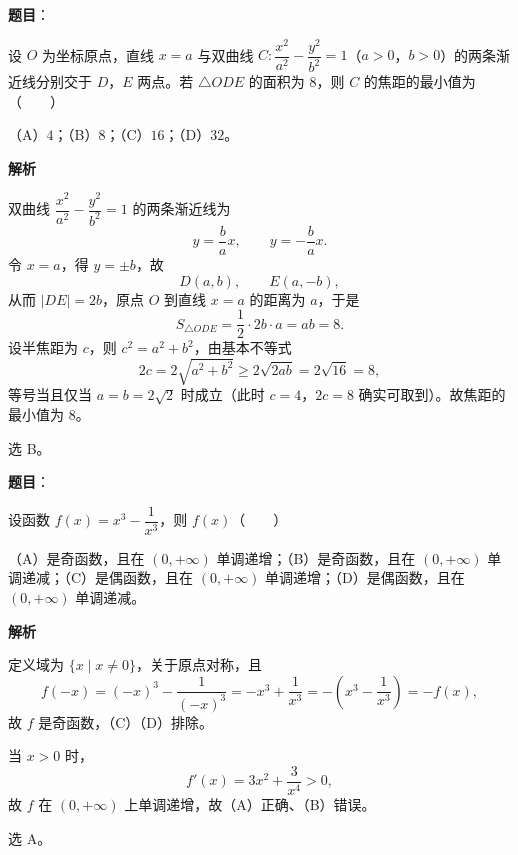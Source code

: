 \begin{answer}

\textbf{题目}：

设 $O$ 为坐标原点，直线 $x=a$ 与双曲线 $C:\dfrac{x^2}{a^2}-\dfrac{y^2}{b^2}=1$（$a>0$，$b>0$）的两条渐近线分别交于 $D$，$E$ 两点。若 $\triangle ODE$ 的面积为 $8$，则 $C$ 的焦距的最小值为\mbox{（　　）}

（A）$4$；（B）$8$；（C）$16$；（D）$32$。

\textbf{解析}

双曲线 $\dfrac{x^2}{a^2}-\dfrac{y^2}{b^2}=1$ 的两条渐近线为
\nopagebreak[4]
\[y=\frac ba x,\qquad y=-\frac ba x .\]
令 $x=a$，得 $y=\pm b$，故
\nopagebreak[4]
\[D(a,b),\qquad E(a,-b),\]
从而 $|DE|=2b$，原点 $O$ 到直线 $x=a$ 的距离为 $a$，于是
\nopagebreak[4]
\[S_{\triangle ODE}=\frac12\cdot 2b\cdot a=ab=8 .\]
设半焦距为 $c$，则 $c^2=a^2+b^2$，由基本不等式
\nopagebreak[4]
\[2c=2\sqrt{a^2+b^2}\geqslant2\sqrt{2ab}=2\sqrt{16}=8,\]
等号当且仅当 $a=b=2\sqrt2$ 时成立（此时 $c=4$，$2c=8$ 确实可取到）。故焦距的最小值为 $8$。

选 B。


\end{answer}
\begin{answer}

\textbf{题目}：

设函数 $f(x)=x^3-\dfrac1{x^3}$，则 $f(x)$\mbox{（　　）}

（A）是奇函数，且在 $(0,+\infty)$ 单调递增；（B）是奇函数，且在 $(0,+\infty)$ 单调递减；（C）是偶函数，且在 $(0,+\infty)$ 单调递增；（D）是偶函数，且在 $(0,+\infty)$ 单调递减。

\textbf{解析}

定义域为 $\{x\mid x\neq0\}$，关于原点对称，且
\nopagebreak[4]
\[f(-x)=(-x)^3-\frac1{(-x)^3}=-x^3+\frac1{x^3}=-\left(x^3-\frac1{x^3}\right)=-f(x),\]
故 $f$ 是奇函数，（C）（D）排除。

当 $x>0$ 时，
\nopagebreak[4]
\[f'(x)=3x^2+\frac3{x^4}>0,\]
故 $f$ 在 $(0,+\infty)$ 上单调递增，故（A）正确、（B）错误。

选 A。


\end{answer}
